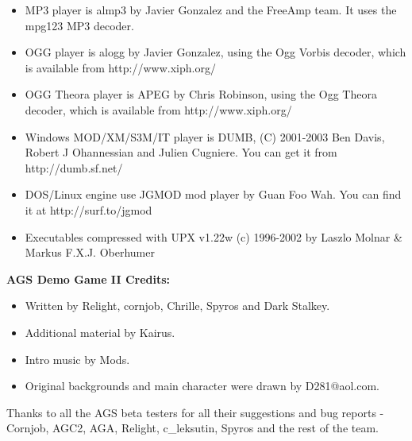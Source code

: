 \begin{itemize}
\item MP3 player is almp3 by Javier Gonzalez and the FreeAmp team. It uses the mpg123 MP3 decoder.
\item OGG player is alogg by Javier Gonzalez, using the Ogg Vorbis decoder, which is available
from http://www.xiph.org/
\item OGG Theora player is APEG by Chris Robinson, using the Ogg Theora decoder, which is available
from http://www.xiph.org/
\item Windows MOD/XM/S3M/IT player is DUMB, (C) 2001-2003 Ben Davis, Robert J Ohannessian and Julien Cugniere. You
can get it from http://dumb.sf.net/
\item DOS/Linux engine use JGMOD mod player by Guan Foo Wah. You can find it at
  http://surf.to/jgmod
\item Executables compressed with UPX v1.22w (c) 1996-2002 by Laszlo Molnar & Markus F.X.J. Oberhumer
\end{itemize}

\bf{AGS Demo Game II Credits:}

\begin{itemize}
\item Written by Relight, cornjob, Chrille, Spyros and Dark Stalkey.
\item Additional material by Kairus.
\item Intro music by Mods.
\item Original backgrounds and main character were drawn by D281@aol.com.
\end{itemize}

Thanks to all the AGS beta testers for all their suggestions and bug reports -
Cornjob, AGC2, AGA, Relight, c_leksutin, Spyros and the rest of the team.



